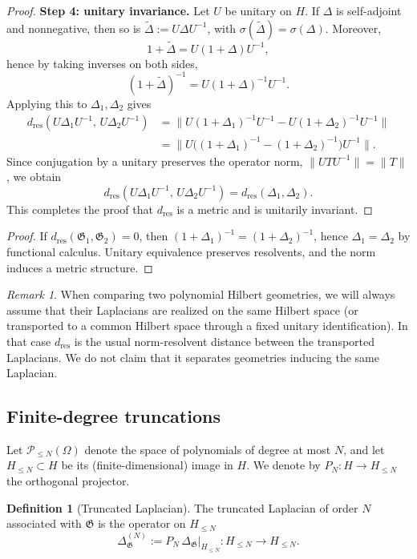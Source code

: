 \documentclass{amsart}
\numberwithin{equation}{section}
\theoremstyle{definition}
\newtheorem{definition}[theorem]{Definition}
\theoremstyle{remark}
\newtheorem{remark}[theorem]{Remark}
\begin{document}
\begin{proof}
\medskip
\noindent\textbf{Step 4: unitary invariance.}
Let $U$ be unitary on $H$. If $\Delta$ is self-adjoint and nonnegative, then so is
$\widetilde\Delta:=U\Delta U^{-1}$, with $\sigma(\widetilde\Delta)=\sigma(\Delta)$.
Moreover,
\[
1+\widetilde\Delta = U(1+\Delta)U^{-1},
\]
hence by taking inverses on both sides,
\[
(1+\widetilde\Delta)^{-1} = U(1+\Delta)^{-1}U^{-1}.
\]
Applying this to $\Delta_1,\Delta_2$ gives
\begin{align*}
d_{\mathrm{res}}(U\Delta_1U^{-1},\,U\Delta_2U^{-1})
&=\big\|U(1+\Delta_1)^{-1}U^{-1}-U(1+\Delta_2)^{-1}U^{-1}\big\| \\
&=\big\|U\big((1+\Delta_1)^{-1}-(1+\Delta_2)^{-1}\big)U^{-1}\big\|.
\end{align*}
Since conjugation by a unitary preserves the operator norm, $\|UTU^{-1}\|=\|T\|$, we obtain
\[
d_{\mathrm{res}}(U\Delta_1U^{-1},\,U\Delta_2U^{-1})=d_{\mathrm{res}}(\Delta_1,\Delta_2).
\]
This completes the proof that $d_{\mathrm{res}}$ is a metric and is unitarily invariant.
\end{proof}

\begin{proof}
If $d_{\mathrm{res}}(\mathfrak G_1,\mathfrak G_2)=0$, then
$(1+\Delta_1)^{-1}=(1+\Delta_2)^{-1}$, hence $\Delta_1=\Delta_2$ by functional calculus.
Unitary equivalence preserves resolvents, and the norm induces a metric structure.
\end{proof}

\begin{remark}
When comparing two polynomial Hilbert geometries, we will always assume that their Laplacians
are realized on the same Hilbert space (or transported to a common Hilbert space through a fixed unitary identification).
In that case $d_{\mathrm{res}}$ is the usual norm-resolvent distance between the transported Laplacians.
We do not claim that it separates geometries inducing the same Laplacian.
\end{remark}

\subsection{Finite-degree truncations}

Let $\mathcal P_{\le N}(\Omega)$ denote the space of polynomials of degree at most $N$,
and let $H_{\le N}\subset H$ be its (finite-dimensional) image in $H$.
We denote by $P_N:H\to H_{\le N}$ the orthogonal projector.

\begin{definition}[Truncated Laplacian]\label{def:truncated-laplacian}
The truncated Laplacian of order $N$ associated with $\mathfrak G$ is the operator on $H_{\le N}$
\[
\Delta_{\mathfrak G}^{(N)} := P_N\,\Delta_{\mathfrak G}\big|_{H_{\le N}} : H_{\le N}\to H_{\le N}.
\]
\end{definition}
\end{document}
